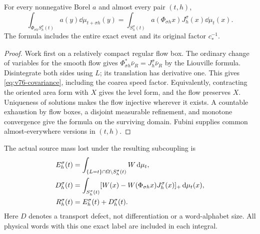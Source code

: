 \begin{lemma}\label{lem:v76-covariance}
For every nonnegative Borel $a$ and almost every pair $(t,h)$,
\begin{equation}\label{eq:v76-covariance}
 \int_{\Phi_{\sigma h}S^\sigma_h(t)}a(y)\dd\mu_{t+\sigma h}(y)
   =\int_{S^\sigma_h(t)}a(\Phi_{\sigma h}x)J^\sigma_h(x)\dd\mu_t(x).
\end{equation}
The formula includes the entire exact event and its original factor
$c_*^{-1}$.
\end{lemma}
\begin{proof}
Work first on a relatively compact regular flow box. The ordinary
change of variables for the smooth flow gives
$\Phi_{\sigma h}^*\bar\nu_R=J^\sigma_h\bar\nu_R$ by the
Liouville formula. Disintegrate both sides using $L$; its translation
has derivative one. This gives \eqref{eq:v76-covariance}, including
the coarea speed factor. Equivalently, contracting the oriented area
form with $X$ gives the level form, and the flow preserves $X$.
Uniqueness of solutions makes the flow injective wherever it exists.
A countable exhaustion by flow boxes, a disjoint measurable refinement,
and monotone convergence give the formula on the surviving domain.
Fubini supplies common almost-everywhere versions in $(t,h)$.
\end{proof}

The actual source mass lost under the resulting subcoupling is
\begin{align}
 E^\sigma_h(t)&=\int_{\{L=t\}\cap\Omega\setminus S^\sigma_h(t)}W\dd\mu_t,
 \notag\\
 D^\sigma_h(t)&=\int_{S^\sigma_h(t)}
       [W(x)-W(\Phi_{\sigma h}x)J^\sigma_h(x)]_+\dd\mu_t(x),
 \notag\\
 R^\sigma_h(t)&=E^\sigma_h(t)+D^\sigma_h(t).
 \label{eq:v76-defect}
\end{align}
Here $D$ denotes a transport defect, not differentiation or a
word-alphabet size. All physical words with this one exact label
are included in each integral.

